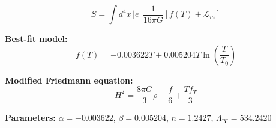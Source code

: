 
\begin{equation}
  S = \int d^4x \, |e| \, \frac{1}{16\pi G} \left[ f(T) + \mathcal{L}_m \right]
\end{equation}

\textbf{Best-fit model:}
\begin{equation}
  f(T) = -0.003622 T + 0.005204 T \ln\!\left(\frac{T}{T_0}\right)
\end{equation}

\textbf{Modified Friedmann equation:}
\begin{equation}
  H^2 = \frac{8\pi G}{3} \rho - \frac{f}{6} + \frac{T f_T}{3}
\end{equation}

\textbf{Parameters:}
$\alpha = -0.003622$, \quad
$\beta = 0.005204$, \quad
$n = 1.2427$, \quad
$\Lambda_{\text{BI}} = 534.2420$
